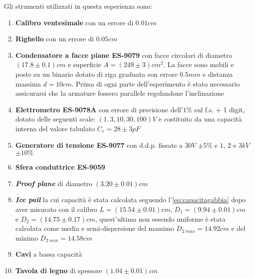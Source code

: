 {\fontsize{11}{14}\selectfont 
Gli strumenti utilizzati in questa esperienza sono:
\begin{enumerate}
    \item \textbf{Calibro ventesimale} con un errore di $0.01 cm$
    \item \textbf{Righello} con un errore di $0.05 cm$
    \item \textbf{Condensatore a facce piane ES-9079} con facce circolari di diametro $(17.8 \pm 0.1) cm$ e superficie $A = (249 \pm 3) cm^2$. La facce sono mobili e poste su un binario dotato di riga graduata con errore $0.5 mm$ e distanza massima $d = 10 cm$. Prima di ogni parte dell'esperimento è stato necessario assicurarsi che la armature fossero parallele regolandone l'inclinazione
    \item \textbf{Elettrometro ES-9078A} con errore di precisione dell'$1\%$ sul f.s. + 1 digit, dotato delle seguenti scale: $(1, 3, 10, 30, 100)V$ e costituito da una capacità interna del valore tabulato $C_e = 28 \pm 3 pF$
    \item \textbf{Generatore di tensione ES-9077} con d.d.p. fissate a $30 V$ $\pm 5\%$ e $1$, $2$ e $3 kV$ $\pm 10\%$
    \item \textbf{Sfera conduttrice ES-9059}
    \item \textbf{\emph{Proof plane}} di diametro $(3.20 \pm 0.01) cm$
    \item \textbf{\emph{Ice pail}} la cui capacità è stata calcolata seguendo l'\autoref{eq:capacitagabbia} dopo aver misurato con il calibro $L = (15.54 \pm 0.01) cm$, $D_1 = (9.94 \pm 0.01) cm$ e $D_2 = (14.75 \pm 0.17) cm$, quest'ultima non essendo uniforme è stata calcolata come media e semi-dispersione del massimo $D_{2 \; max} = 14.92 cm$ e del minimo $D_{2 \; min} = 14.58 cm$
    \item \textbf{Cavi} a bassa capacità
    \item \textbf{Tavola di legno} di spessore $(1.04 \pm 0.01)cm$%
\end{enumerate}

\par}